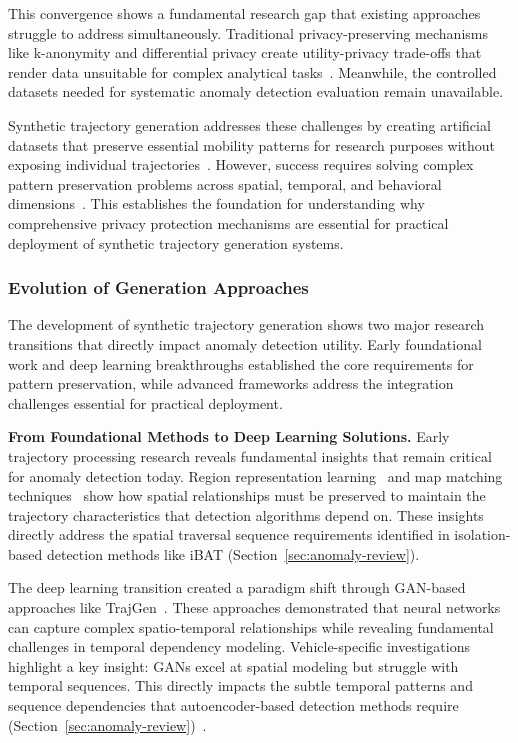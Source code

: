 \documentclass[runningheads]{llncs}
\begin{document}
This convergence shows a fundamental research gap that existing approaches struggle to address simultaneously. Traditional privacy-preserving mechanisms like k-anonymity and differential privacy create utility-privacy trade-offs that render data unsuitable for complex analytical tasks~\cite{jordonPATEGANGeneratingSynthetic2019}. Meanwhile, the controlled datasets needed for systematic anomaly detection evaluation remain unavailable.

Synthetic trajectory generation addresses these challenges by creating artificial datasets that preserve essential mobility patterns for research purposes without exposing individual trajectories~\cite{caoGeneratingMobilityTrajectories2021}. However, success requires solving complex pattern preservation problems across spatial, temporal, and behavioral dimensions~\cite{kongMobilityTrajectoryGeneration2023,merhiSyntheticTrajectoryGeneration2024}. This establishes the foundation for understanding why comprehensive privacy protection mechanisms are essential for practical deployment of synthetic trajectory generation systems.

\subsubsection{Evolution of Generation Approaches}

The development of synthetic trajectory generation shows two major research transitions that directly impact anomaly detection utility. Early foundational work and deep learning breakthroughs established the core requirements for pattern preservation, while advanced frameworks address the integration challenges essential for practical deployment.

\textbf{From Foundational Methods to Deep Learning Solutions.} Early trajectory processing research reveals fundamental insights that remain critical for anomaly detection today. Region representation learning~\cite{wangRegionRepresentationLearning2017} and map matching techniques~\cite{newsonHiddenMarkovMap2009} show how spatial relationships must be preserved to maintain the trajectory characteristics that detection algorithms depend on. These insights directly address the spatial traversal sequence requirements identified in isolation-based detection methods like iBAT (Section~\ref{sec:anomaly-review}).

The deep learning transition created a paradigm shift through GAN-based approaches like TrajGen~\cite{caoGeneratingMobilityTrajectories2021}. These approaches demonstrated that neural networks can capture complex spatio-temporal relationships while revealing fundamental challenges in temporal dependency modeling. Vehicle-specific investigations~\cite{bajarunasGenerativeAdversarialNetworks2022} highlight a key insight: GANs excel at spatial modeling but struggle with temporal sequences. This directly impacts the subtle temporal patterns and sequence dependencies that autoencoder-based detection methods require (Section~\ref{sec:anomaly-review})~\cite{huangLSTMAutoencodersAttention2021}.
\end{document}

